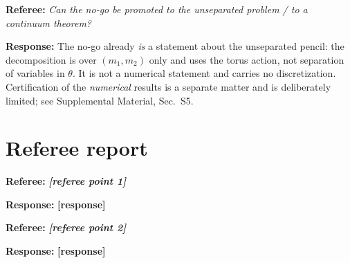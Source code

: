 \documentclass[11pt]{article}
\newcommand{\TODO}[1]{\textbf{[#1]}}
\newcommand{\refpoint}[1]{\medskip\noindent\textbf{Referee:} \emph{#1}\par\medskip\noindent\textbf{Response:} }
\begin{document}
\refpoint{Can the no-go be promoted to the unseparated problem / to a continuum
theorem?}
The no-go already \emph{is} a statement about the unseparated pencil: the
decomposition is over $(m_1,m_2)$ only and uses the torus action, not separation
of variables in $\theta$. It is not a numerical statement and carries no
discretization. Certification of the \emph{numerical} results is a separate
matter and is deliberately limited; see Supplemental Material, Sec.~S5.

\section*{Referee report}

\refpoint{\TODO{referee point 1}}
\TODO{response}

\refpoint{\TODO{referee point 2}}
\TODO{response}
\end{document}
